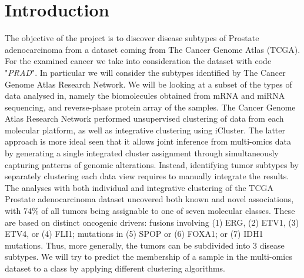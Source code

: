 \chapter{Introduction}
The objective of the project is to discover disease subtypes of Prostate adenocarcinoma from a dataset coming from The Cancer Genome Atlas (TCGA)\cite{hutter2018TCGA}. For the examined cancer we take into consideration the dataset with code "\textit{PRAD}". In particular we will consider the subtypes identified by The Cancer Genome Atlas Research Network\cite{abeshouse2015molecularPRAD}. We will be looking at a subset of the types of data analysed in\cite{abeshouse2015molecularPRAD}, namely the biomolecules  obtained from mRNA and miRNA sequencing, and reverse-phase protein array of the samples. The Cancer Genome Atlas Research Network performed unsupervised
clustering of data from each molecular platform, as well as integrative clustering using iCluster\cite{shen2009integrative}. The latter approach is more ideal seen that it allows joint inference from multi-omics data by generating a single integrated cluster assignment through simultaneously capturing patterns of genomic alterations. Instead, identifying tumor subtypes by separately clustering each data view requires to manually integrate the results.
The analyses with both individual and integrative clustering of the TCGA Prostate adenocarcinoma dataset uncovered both known and novel associations, with 74\% of all tumors being assignable to one of seven molecular classes. These are based on distinct oncogenic drivers: fusions involving (1) ERG, (2) ETV1, (3) ETV4, or (4) FLI1; mutations in (5) SPOP
or (6) FOXA1; or (7) IDH1 mutations. Thus, more generally, the tumors can be subdivided into 3 disease subtypes. We will try to predict the membership of a sample in the multi-omics dataset to a class by applying different clustering algorithms.

